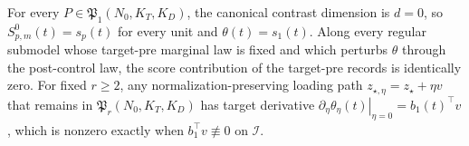 For every \(P\in\mathfrak P_1(N_0,K_T,K_D)\), the canonical contrast dimension is \(d=0\), so \(S^0_{p,m}(t)=s_p(t)\) for every unit and \(\theta(t)=s_1(t)\). Along every regular submodel whose target-pre marginal law is fixed and which perturbs \(\theta\) through the post-control law, the score contribution of the target-pre records is identically zero. For fixed \(r\ge2\), any normalization-preserving loading path \(z_{\star,\eta}=z_\star+\eta v\) that remains in \(\mathfrak P_r(N_0,K_T,K_D)\) has target derivative \(\left.\partial_\eta\theta_\eta(t)\right|_{\eta=0}=b_1(t)^\top v\), which is nonzero exactly when \(b_1^\top v\not\equiv0\) on \(\mathcal I\).
